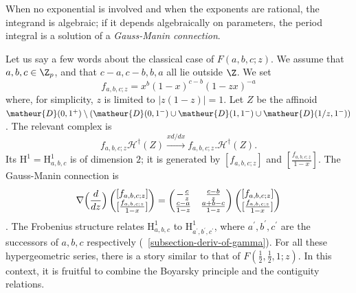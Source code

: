 \begin{para}
 When no exponential is involved and when the exponents are rational,
 the integrand is algebraic; if it depends algebraically on parameters,
  the period integral is a solution of a {\it Gauss-Manin connection}. 

 Let us say a few words about the classical case of
 $F(a,b,c;z)$.  We assume that $a,b,c \in {\Z}_p$, and that $c-a,c-b,b,a$
 all lie outside $\Z$.  We set
 \begin{equation*}
 f_{a,b,c;z}=
 x^b(1-x)^{c-b}(1-zx)^{-a}
 \end{equation*}
 where, for simplicity, $z$ is limited to $\vert z(1-z)\vert = 1$.  Let
 $Z$ be the affinoid $\matheur{D}(0,1^+)\setminus
 (\matheur{D}(0,1^-)\cup \matheur{D}(1,1^-)\cup \matheur{D}(1/z,1^-))$.
 The relevant complex is
 \begin{equation*}
 f_{a,b,c;z}\mathcal{H}^{\dagger}(Z)
 \xrightarrow{xd/dx} f_{a,b,c;z}.\mathcal{H}^{\dagger}(Z).
 \end{equation*}
 Its $\mathrm{H}^1=\mathrm{H}^1_{a,b,c}$ is of dimension $2$; it is
 generated by $[f_{a,b,c;z}]$ and $[\frac{f_{a,b,c;z}}{1-x}]$. The
 Gauss-Manin connection is
 \begin{equation*}
 \nabla\Bigl(\frac{d}{dz}\Bigr)
  \begin{pmatrix}
   [f_{a,b,c;z}] \\ {}
   [\frac{f_{a,b,c;z}}{1-x}]
  \end{pmatrix}
 =
 \begin{pmatrix}
  -\frac{c}{z} & \frac{c-b}{z} \\ 
  \frac{c-a}{1-z} & \frac{a+b-c}{1-z}
 \end{pmatrix}
 \begin{pmatrix}
  [f_{a,b,c;z}] \\ {}
  [\frac{f_{a,b,c;z}}{1-x}]
 \end{pmatrix}
 \end{equation*}
  \cf \cite[3.1, 1.2]{lopde}.  The Frobenius structure relates
 $\mathrm{H}^1_{a,b,c}$ to
 $\mathrm{H}^1_{a^{\prime},b^{\prime},c^{\prime}}$, where
 $a^{\prime},b^{\prime},c^{\prime}$ are the successors of $a,b,c$
 respectively (\cf~\ref{subsection-deriv-of-gamma}).  For all these
 hypergeometric series, there is a story similar to that of
 $F(\frac{1}{2},\frac{1}{2},1;z)$.  In this context, it is fruitful to
 combine the Boyarsky principle and the contiguity relations.
\end{para}

